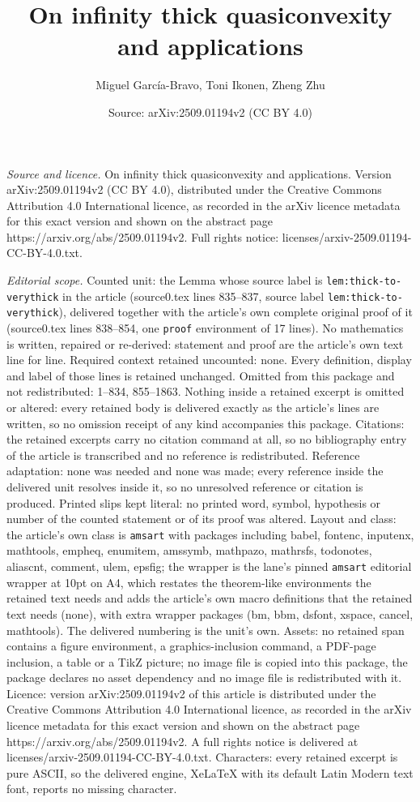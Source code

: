 \documentclass[10pt,a4paper]{amsart}
\title[On infinity thick quasiconvexity and applications]{On infinity thick quasiconvexity and applications}
\author{Miguel Garc\'ia-Bravo, Toni Ikonen, Zheng Zhu}
\date{Source: arXiv:2509.01194v2 (CC BY 4.0)}
\begin{document}
\maketitle

\noindent\emph{Source and licence.} On infinity thick quasiconvexity and applications. Version arXiv:2509.01194v2 (CC BY 4.0), distributed under the Creative Commons Attribution 4.0 International licence, as recorded in the arXiv licence metadata for this exact version and shown on the abstract page https://arxiv.org/abs/2509.01194v2. Full rights notice: licenses/arxiv-2509.01194-CC-BY-4.0.txt.\par\smallskip

\noindent\textit{Editorial scope.} Counted unit: the Lemma whose source label is \texttt{lem:thick-to-verythick} in the article (source0.tex lines 835--837, source label \texttt{lem:thick-to-verythick}), delivered together with the article's own complete original proof of it (source0.tex lines 838--854, one \texttt{proof} environment of 17 lines). No mathematics is written, repaired or re-derived: statement and proof are the article's own text line for line. Required context retained uncounted: none. Every definition, display and label of those lines is retained unchanged. Omitted from this package and not redistributed: 1--834, 855--1863. Nothing inside a retained excerpt is omitted or altered: every retained body is delivered exactly as the article's lines are written, so no omission receipt of any kind accompanies this package. Citations: the retained excerpts carry no citation command at all, so no bibliography entry of the article is transcribed and no reference is redistributed. Reference adaptation: none was needed and none was made; every reference inside the delivered unit resolves inside it, so no unresolved reference or citation is produced. Printed slips kept literal: no printed word, symbol, hypothesis or number of the counted statement or of its proof was altered. Layout and class: the article's own class is \texttt{amsart} with packages including babel, fontenc, inputenx, mathtools, empheq, enumitem, amssymb, mathpazo, mathrsfs, todonotes, aliascnt, comment, ulem, epsfig; the wrapper is the lane's pinned \texttt{amsart} editorial wrapper at 10pt on A4, which restates the theorem-like environments the retained text needs and adds the article's own macro definitions that the retained text needs (none), with extra wrapper packages (bm, bbm, dsfont, xspace, cancel, mathtools). The delivered numbering is the unit's own. Assets: no retained span contains a figure environment, a graphics-inclusion command, a PDF-page inclusion, a table or a TikZ picture; no image file is copied into this package, the package declares no asset dependency and no image file is redistributed with it. Licence: version arXiv:2509.01194v2 of this article is distributed under the Creative Commons Attribution 4.0 International licence, as recorded in the arXiv licence metadata for this exact version and shown on the abstract page https://arxiv.org/abs/2509.01194v2. A full rights notice is delivered at licenses/arxiv-2509.01194-CC-BY-4.0.txt. Characters: every retained excerpt is pure ASCII, so the delivered engine, XeLaTeX with its default Latin Modern text font, reports no missing character.
\end{document}
